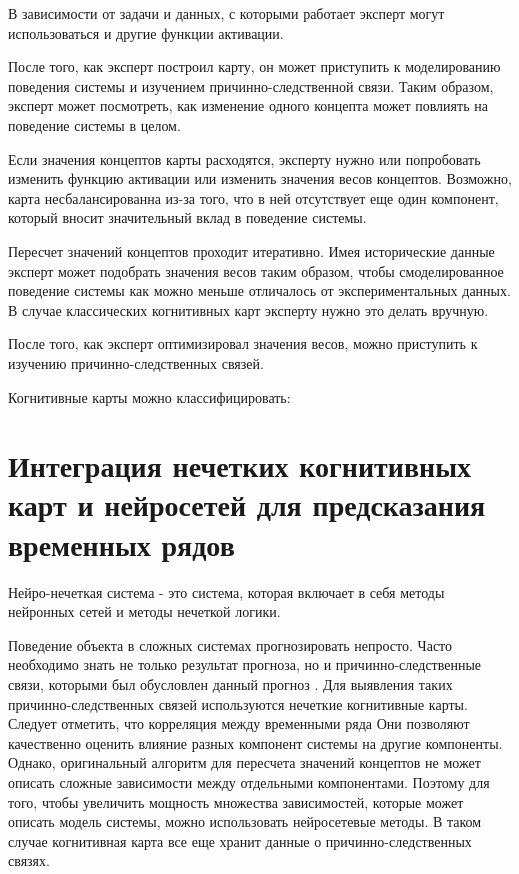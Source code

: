 В зависимости от задачи и данных, с которыми работает эксперт могут использоваться и другие
функции активации.

После того, как эксперт построил карту, он может приступить к моделированию поведения
системы и изучением причинно-следственной связи. Таким образом, эксперт может посмотреть,
как изменение одного концепта может повлиять на поведение системы в целом.

Если значения концептов карты расходятся, эксперту нужно или попробовать изменить функцию
активации или изменить значения весов концептов. Возможно, карта несбалансированна из-за
того, что в ней отсутствует еще один компонент, который вносит значительный вклад в поведение системы.

Пересчет значений концептов проходит итеративно. Имея исторические данные эксперт может
подобрать значения весов таким образом, чтобы смоделированное поведение системы как можно меньше отличалось
от экспериментальных данных. В случае классических когнитивных карт эксперту нужно это делать вручную.

После того, как эксперт оптимизировал значения весов, можно приступить к изучению причинно-следственных
связей.

Когнитивные карты можно классифицировать:


\section{Интеграция нечетких когнитивных карт и нейросетей для предсказания временных рядов}

Нейро-нечеткая система - это система, которая включает в себя методы нейронных сетей и методы нечеткой логики.

Поведение объекта в сложных системах прогнозировать непросто.
Часто необходимо знать не только результат прогноза,
но и причинно-следственные связи, которыми был обусловлен данный прогноз
\cite{osoba2019dags} \cite{efficient_fcms}.
Для выявления таких причинно-следственных связей используются нечеткие когнитивные карты.
Следует отметить, что корреляция между временными ряда
Они позволяют качественно оценить влияние разных компонент системы на другие компоненты.
Однако, оригинальный алгоритм для пересчета значений концептов
не может описать сложные зависимости между отдельными компонентами.
Поэтому для того, чтобы увеличить мощность множества зависимостей, которые
может описать модель системы, можно использовать нейросетевые методы.
В таком случае когнитивная карта все еще хранит данные о причинно-следственных связях.

